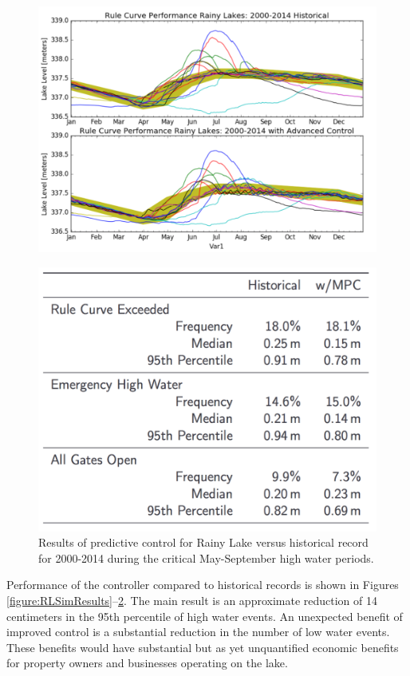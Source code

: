 \documentclass[preprint,times]{elsarticle}
\begin{document}
\begin{figure}
\includegraphics[width=\linewidth]{RLSimResultsA}
\caption{}\label{figure:RLSimResultsA}
\end{figure}

\begin{figure}
\includegraphics[width=\linewidth]{RLSimResultsB}
\caption{Results of predictive control for Rainy Lake versus historical record for 2000-2014 during the critical May-September high water periods.}\label{figure:RLSimResultsB}
\end{figure}

Performance of the controller compared to historical records is shown in Figures \ref{figure:RLSimResults}--\ref{figure:RLSimResultsB}. The main result is an approximate reduction of 14 centimeters in the 95th percentile of high water events. An unexpected benefit of improved control is a substantial reduction in the number of low water events. These benefits would have substantial but as yet unquantified economic benefits for property owners and businesses operating on the lake.
\end{document}
